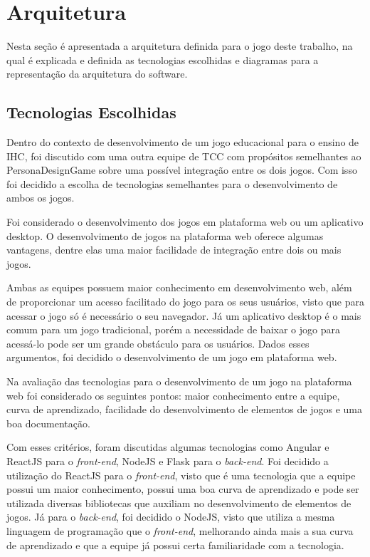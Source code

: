 {\color{textadded}
\section{Arquitetura}
\label{sec:arq}

Nesta seção é apresentada a arquitetura definida para o jogo deste trabalho, na qual é explicada e definida as tecnologias escolhidas e diagramas para a representação da arquitetura do software.

\subsection{Tecnologias Escolhidas}
\label{ssec:tec_escolhidas}

Dentro do contexto de desenvolvimento de um jogo educacional para o ensino de IHC, foi discutido com uma outra equipe de TCC com propósitos semelhantes ao PersonaDesignGame sobre uma possível integração entre os dois jogos. Com isso foi decidido a escolha de tecnologias semelhantes para o desenvolvimento de ambos os jogos.

Foi considerado o desenvolvimento dos jogos em plataforma web ou um aplicativo desktop. O desenvolvimento de jogos na plataforma web oferece algumas vantagens, dentre elas uma maior facilidade de integração entre dois ou mais jogos.

Ambas as equipes possuem maior conhecimento em desenvolvimento web, além de proporcionar um acesso facilitado do jogo para os seus usuários, visto que para acessar o jogo só é necessário o seu navegador. Já um aplicativo desktop é o mais comum para um jogo tradicional, porém a necessidade de baixar o jogo para acessá-lo pode ser um grande obstáculo para os usuários. Dados esses argumentos, foi decidido o desenvolvimento de um jogo em plataforma web.

Na avaliação das tecnologias para o desenvolvimento de um jogo na plataforma web foi considerado os seguintes pontos: maior conhecimento entre a equipe, curva de aprendizado, facilidade do desenvolvimento de elementos de jogos e uma boa documentação.

Com esses critérios, foram discutidas algumas tecnologias como Angular e ReactJS para o \textit{front-end}, NodeJS e Flask para o \textit{back-end}. Foi decidido a utilização do ReactJS para o \textit{front-end}, visto que é uma tecnologia que a equipe possui um maior conhecimento, possui uma boa curva de aprendizado e pode ser utilizada diversas bibliotecas que auxiliam no desenvolvimento de elementos de jogos. Já para o \textit{back-end}, foi decidido o NodeJS, visto que utiliza a mesma linguagem de programação que o \textit{front-end}, melhorando ainda mais a sua curva de aprendizado e que a equipe já possui certa familiaridade com a tecnologia.

}

